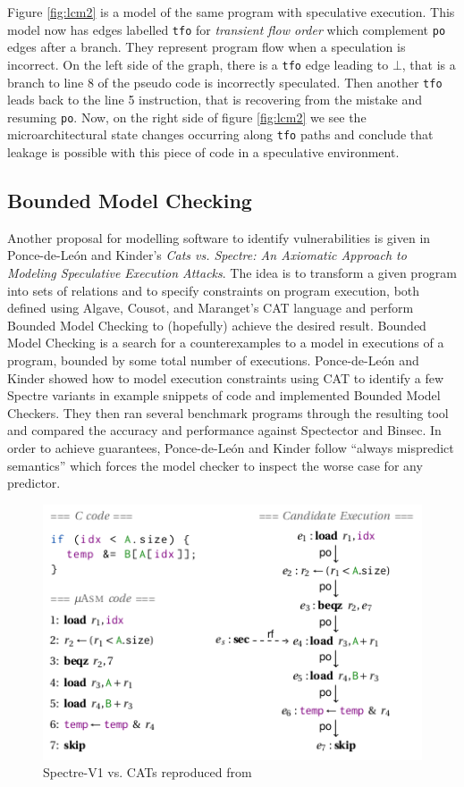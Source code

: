 \documentclass[11pt,conference]{IEEEtran}
\begin{document}
Figure \ref{fig:lcm2} is a model of the same program with speculative execution.
This model now has edges labelled \texttt{tfo} for \emph{transient flow order} which complement \texttt{po} edges after a branch.
They represent program flow when a speculation is incorrect.
On the left side of the graph, there is a \texttt{tfo} edge leading to $\bot$, that is a branch to line 8 of the pseudo code is incorrectly speculated.
Then another \texttt{tfo} leads back to the line 5 instruction, that is recovering from the mistake and resuming \texttt{po}.
Now, on the right side of figure \ref{fig:lcm2} we see the microarchitectural state changes occurring along \texttt{tfo} paths and conclude that leakage is possible with this piece of code in a speculative environment.

\subsection{Bounded Model Checking}

Another proposal for modelling software to identify vulnerabilities is given in Ponce-de-León and Kinder's \textit{Cats vs. Spectre: An Axiomatic Approach to Modeling Speculative Execution Attacks}\cite{cats2022}.
The idea is to transform a given program into sets of relations and to specify constraints on program execution, both defined using Algave, Cousot, and Maranget's CAT language\cite{alglave2016syntax} and perform Bounded Model Checking\cite{biere2021BoundedMC} to (hopefully) achieve the desired result.
Bounded Model Checking is a search for a counterexamples to a model in executions of a program, bounded by some total number of executions.
Ponce-de-León and Kinder showed how to model execution constraints using CAT to identify a few Spectre variants in example snippets of code and implemented Bounded Model Checkers.
They then ran several benchmark programs through the resulting tool and compared the accuracy and performance against Spectector and Binsec. 
In order to achieve guarantees, Ponce-de-León and Kinder follow ``always mispredict semantics'' which forces the model checker to inspect the worse case for any predictor.

\begin{figure}[t]
  \centering
  \includegraphics[width=0.9\linewidth]{cats1}
	\caption{Spectre-V1 vs. CATs reproduced from \cite{cats2022}}
  \label{fig:cats1}
\end{figure}
\end{document}

